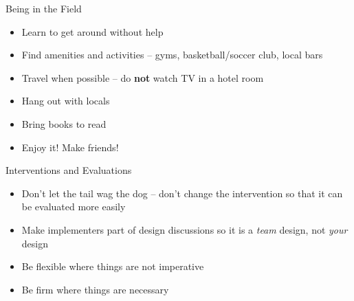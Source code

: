 \documentclass[11pt,ignorenonframetext,xcolor={svgnames}]{beamer}
\providecommand{\tightlist}{%
  \setlength{\itemsep}{0pt}\setlength{\parskip}{0pt}}
\begin{document}
\begin{frame}{Being in the Field}
\protect\hypertarget{being-in-the-field-3}{}
\begin{itemize}
\tightlist
\item
  Learn to get around without help
\item
  Find amenities and activities -- gyms, basketball/soccer club, local
  bars
\item
  Travel when possible -- do \textbf{not} watch TV in a hotel room
\item
  Hang out with locals
\item
  Bring books to read
\end{itemize}

\medskip

\begin{itemize}
\tightlist
\item
  Enjoy it! Make friends!
\end{itemize}
\end{frame}

\begin{frame}{Interventions and Evaluations}
\protect\hypertarget{interventions-and-evaluations}{}
\begin{itemize}
\tightlist
\item
  Don't let the tail wag the dog -- don't change the intervention so
  that it can be evaluated more easily
\item
  Make implementers part of design discussions so it is a \emph{team}
  design, not \emph{your} design
\item
  Be flexible where things are not imperative
\item
  Be firm where things are necessary
\end{itemize}
\end{frame}
\end{document}
